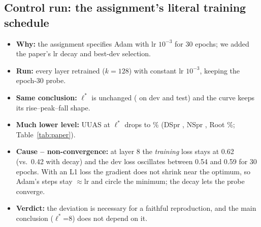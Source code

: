 \documentclass[11pt,a4paper]{article}
\newcommand{\lstar}{\ensuremath{\ell^*}}
\begin{document}
\subsection{Control run: the assignment's literal training schedule}\label{sec:literal}
\begin{itemize}
\item \textbf{Why:} the assignment specifies Adam with lr $10^{-3}$ for 30 epochs; we added the paper's lr decay and best-dev selection.
\item \textbf{Run:} every layer retrained ($k=128$) with constant lr $10^{-3}$, keeping the epoch-30 probe.
\item \textbf{Same conclusion:} \lstar{} is unchanged (\LitLstar{} on dev and test) and the curve keeps its rise--peak--fall shape.
\item \textbf{Much lower level:} UUAS at \lstar{} drops to \LitUuas\% (DSpr \LitDspr, NSpr \LitNspr, Root \LitRoot\%; Table~\ref{tab:paper}).
\item \textbf{Cause -- non-convergence:} at layer 8 the \emph{training} loss stays at 0.62 (vs.\ 0.42 with decay) and the dev loss oscillates
between 0.54 and 0.59 for 30 epochs. With an L1 loss the gradient does not shrink near the optimum, so Adam's steps stay $\approx$lr and
circle the minimum; the decay lets the probe converge.
\item \textbf{Verdict:} the deviation is necessary for a faithful reproduction, and the main conclusion (\lstar=8) does not depend on it.
\end{itemize}
\end{document}
